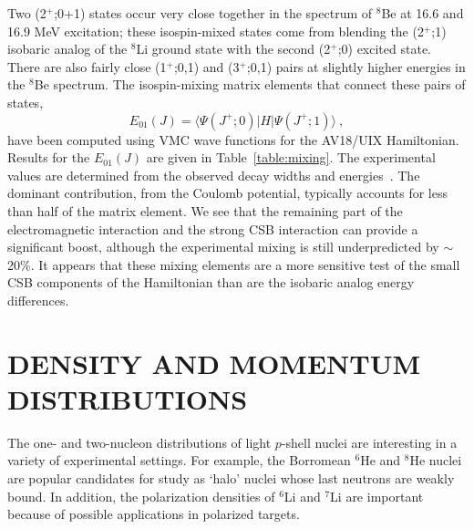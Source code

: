 Two (2$^+$;0+1) states occur very close together in the spectrum of $^8$Be at
16.6 and 16.9 MeV excitation; these isospin-mixed states come from blending the
(2$^+$;1) isobaric analog of the $^8$Li ground state with the second (2$^+$;0) 
excited state.
There are also fairly close (1$^+$;0,1) and (3$^+$;0,1) pairs at slightly
higher energies in the $^8$Be spectrum.
The isospin-mixing matrix elements that connect these pairs of states,
\begin{equation}
   E_{01}(J) = \langle \Psi(J^+;0) | H | \Psi(J^+;1) \rangle \ ,
\end{equation}
have been computed using VMC wave functions for the AV18/UIX Hamiltonian.
Results for the $E_{01}(J)$ are given in Table~\ref{table:mixing}.
The experimental values are determined from the observed decay widths
and energies~\cite{B66}.
The dominant contribution, from the Coulomb potential, typically 
accounts for less than half of the matrix element.
We see that the remaining part of the electromagnetic interaction and 
the strong CSB interaction can provide a significant boost, although
the experimental mixing is still underpredicted by $\sim$20\%.
It appears that these mixing elements are a more sensitive test
of the small CSB components of the Hamiltonian than are the isobaric analog
energy differences.

\section{DENSITY AND MOMENTUM DISTRIBUTIONS}

The one- and two-nucleon distributions of light $p$-shell nuclei
are interesting in a variety of experimental settings.
For example, the Borromean $^6$He and $^8$He nuclei are popular candidates 
for study as `halo' nuclei whose last neutrons are weakly bound.
In addition, the polarization densities of $^6$Li and $^7$Li are important
because of possible applications in polarized targets.


